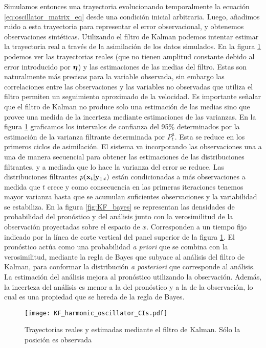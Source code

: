 Simulamos entonces una trayectoria evolucionando temporalmente la ecuación \ref{eq:oscillator_matrix_eq} desde una condición inicial arbitraria. Luego, añadimos ruido a esta trayectoria para representar el error observacional, y obtenemos observaciones sintéticas. Utilizando el filtro de Kalman podemos intentar estimar la trayectoria real a través de la asimilación de los datos simulados. En la figura \ref{fig:KF_harmonic_oscillator} podemos ver las trayectorias reales (que no tienen amplitud constante debido al error introducido por $\mbox{\boldmath$ \eta $}$) y las estimaciones de las medias del filtro. Estas son naturalmente más precisas para la variable observada, sin embargo las correlaciones entre las observaciones y las variables no observadas que utiliza el filtro permiten un seguimiento aproximado de la velocidad. Es importante señalar que el filtro de Kalman no produce solo una estimación de las medias sino que provee una medida de la incerteza mediante estimaciones de las varianzas. En la figura \ref{fig:KF_harmonic_oscillator} graficamos los intervalos de confianza del 95\% determinados por la estimación de la varianza filtrante determinada por $P_t^a$. Esta se reduce en los primeros ciclos de asimilación. El sistema va incorporando las observaciones una a una de manera secuencial para obtener las estimaciones de las distribuciones filtrantes, y a mediada que lo hace la varianza del error se reduce. Las distribuciones filtrantes $p(\mathbf{x}_t | \mathbf{y}_{1:t})$ están condicionadas a más observaciones a medida que $t$ crece y como consecuencia en las primeras iteraciones tenemos mayor varianza hasta que se acumulan suficientes observaciones y la variabilidad se estabiliza. En la figura \ref{fig:KF_bayes} se representan las densidades de probabilidad del pronóstico y del análisis junto con la verosimilitud de la observación proyectadas sobre el espacio de $x$. Corresponden a un tiempo fijo indicado por la línea de corte vertical del panel superior de la figura \ref{fig:KF_harmonic_oscillator}. El pronóstico actúa como una probabilidad \textit{a priori} que se combina con la verosimilitud, mediante la regla de Bayes que subyace al análisis del filtro de Kalman, para conformar la distribución \textit{a posteriori} que corresponde al análisis. La estimación del análisis mejora al pronóstico utilizando la observación. Además, la incerteza del análisis es menor a la del pronóstico y a la de la observación, lo cual es una propiedad que se hereda de la regla de Bayes. 

\begin{figure}[h!]
    \centering
    \texttt{[image: KF\_harmonic\_oscillator\_CIs.pdf]}
    \caption{Trayectorias reales y estimadas mediante el filtro de Kalman. Sólo la posición es observada}
    \label{fig:KF_harmonic_oscillator}
\end{figure}

